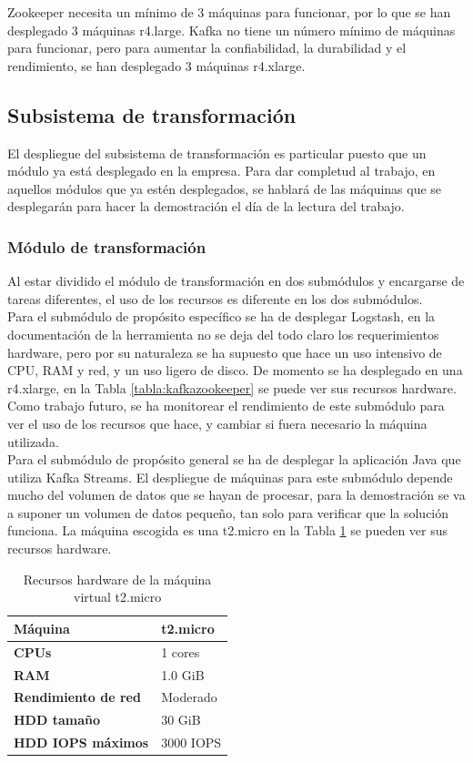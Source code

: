 Zookeeper necesita un mínimo de 3 máquinas para funcionar, por lo que se han desplegado 3 máquinas r4.large.
Kafka no tiene un número mínimo de máquinas para funcionar, pero para aumentar la confiabilidad, la durabilidad y el rendimiento, se han desplegado 3 máquinas r4.xlarge.

\subsection{Subsistema de transformación}
El despliegue del subsistema de transformación es particular puesto que un módulo ya está desplegado en la empresa. Para dar completud al trabajo, en aquellos módulos que ya estén desplegados, se hablará de las máquinas que se desplegarán para hacer la demostración el día de la lectura del trabajo.

\subsubsection{Módulo de transformación}
Al estar dividido el módulo de transformación en dos submódulos y encargarse de tareas diferentes, el uso de los recursos es diferente en los dos submódulos. 
\\
Para el submódulo de propósito específico se ha de desplegar Logstash, en la documentación de la herramienta no se deja del todo claro los requerimientos hardware\cite{Tfg:logstashdeploy}, pero por su naturaleza se ha supuesto que hace un uso intensivo de CPU, RAM y red, y un uso ligero de disco. De momento se ha desplegado en una r4.xlarge, en la Tabla \ref{tabla:kafkazookeeper} se puede ver sus recursos hardware. Como trabajo futuro, se ha monitorear el rendimiento de este submódulo para ver el uso de los recursos que hace, y cambiar si fuera necesario la máquina utilizada.
\\
Para el submódulo de propósito general se ha de desplegar la aplicación Java que utiliza Kafka Streams. El despliegue de máquinas para este submódulo depende mucho del volumen de datos que se hayan de procesar, para la demostración se va a suponer un volumen de datos pequeño, tan solo para verificar que la solución funciona. La máquina escogida es una t2.micro en la Tabla \ref{tabla:t2.micro} se pueden ver sus recursos hardware.

\begin{table}[H]\label{tabla:t2.micro}
	\centering
	\begin{tabular}{|l|l|}
		\hline
		\textbf{Máquina}            & \textbf{t2.micro}      \\ \hline
		\textbf{CPUs}               & 1 cores                \\ \hline
		\textbf{RAM}                & 1.0 GiB                \\ \hline
		\textbf{Rendimiento de red} & Moderado               \\ \hline
		\textbf{HDD tamaño}         & 30 GiB                 \\ \hline
		\textbf{HDD IOPS máximos}   & 3000 IOPS              \\ \hline
	\end{tabular}
	\caption{Recursos hardware de la máquina virtual t2.micro}
\end{table}

